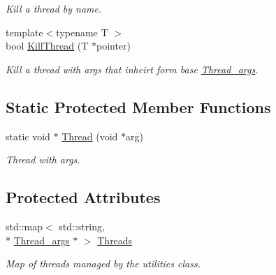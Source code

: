 \begin{DoxyCompactItemize}
\begin{DoxyCompactList}\small\item\em Kill a thread by name. \end{DoxyCompactList}\item 
\hypertarget{classUtilities_af4091a68d8a27a3b806d029cc9b2135e}{{\footnotesize template$<$typename T $>$ }\\bool \hyperlink{classUtilities_af4091a68d8a27a3b806d029cc9b2135e}{Kill\-Thread} (T $\ast$pointer)}\label{classUtilities_af4091a68d8a27a3b806d029cc9b2135e}

\begin{DoxyCompactList}\small\item\em Kill a thread with args that inheirt form base \hyperlink{structThread__args}{Thread\-\_\-args}. \end{DoxyCompactList}\end{DoxyCompactItemize}
\subsection*{Static Protected Member Functions}
\begin{DoxyCompactItemize}
\item 
\hypertarget{classUtilities_a29b7f99dcb44ddb9a519c3e441a7fa2b}{static void $\ast$ \hyperlink{classUtilities_a29b7f99dcb44ddb9a519c3e441a7fa2b}{Thread} (void $\ast$arg)}\label{classUtilities_a29b7f99dcb44ddb9a519c3e441a7fa2b}

\begin{DoxyCompactList}\small\item\em Thread with args. \end{DoxyCompactList}\end{DoxyCompactItemize}
\subsection*{Protected Attributes}
\begin{DoxyCompactItemize}
\item 
\hypertarget{classUtilities_a26ebd7308ea895452c4c1066dc5834e5}{std\-::map$<$ std\-::string, \\*
\hyperlink{structThread__args}{Thread\-\_\-args} $\ast$ $>$ \hyperlink{classUtilities_a26ebd7308ea895452c4c1066dc5834e5}{Threads}}\label{classUtilities_a26ebd7308ea895452c4c1066dc5834e5}

\begin{DoxyCompactList}\small\item\em Map of threads managed by the utilities class. \end{DoxyCompactList}\end{DoxyCompactItemize}


